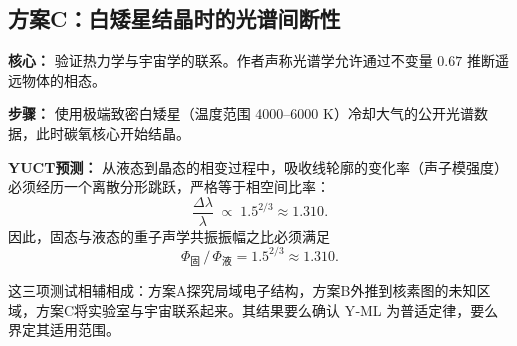 \documentclass[11pt,a4paper]{article}
\begin{document}
	\subsection{方案C：白矮星结晶时的光谱间断性}
	\textbf{核心：} 验证热力学与宇宙学的联系。作者声称光谱学允许通过不变量 \(0.67\) 推断遥远物体的相态。
	
	\textbf{步骤：} 使用极端致密白矮星（温度范围 4000–6000 K）冷却大气的公开光谱数据，此时碳氧核心开始结晶。
	
	\textbf{YUCT预测：} 从液态到晶态的相变过程中，吸收线轮廓的变化率（声子模强度）必须经历一个离散分形跳跃，严格等于相空间比率：
	\begin{equation}
		\frac{\Delta \lambda}{\lambda} \;\propto\; 1.5^{2/3} \approx 1.310 .
	\end{equation}
	因此，固态与液态的重子声学共振振幅之比必须满足
	\begin{equation}
		\Phi_{\text{固}} \,/\, \Phi_{\text{液}} = 1.5^{2/3} \approx 1.310 .
	\end{equation}
	
	这三项测试相辅相成：方案A探究局域电子结构，方案B外推到核素图的未知区域，方案C将实验室与宇宙联系起来。其结果要么确认 Y‑ML 为普适定律，要么界定其适用范围。
	
\end{document}
